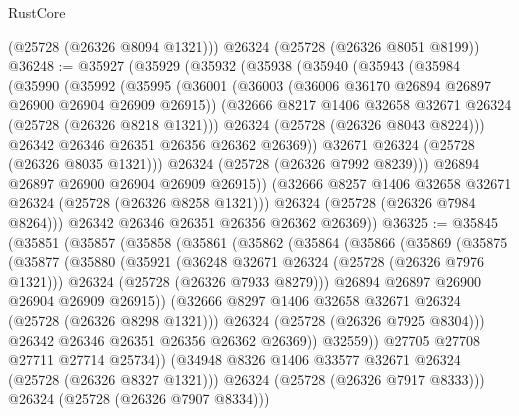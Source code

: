 \begin{lexlean}{RustCore}
\begin{coremodule}
      (@25728 (@26326 @8094 @1321)))
    @26324
    (@25728 (@26326 @8051 @8199))
@36248 := @35927
    (@35929
      (@35932
        (@35938
          (@35940
            (@35943
              (@35984
                (@35990
                  (@35992
                    (@35995
                      (@36001
                        (@36003 (@36006 @36170 @26894 @26897 @26900 @26904 @26909 @26915))
                        (@32666 @8217 @1406 @32658 @32671 @26324 (@25728 (@26326 @8218 @1321)))
                        @26324
                        (@25728 (@26326 @8043 @8224)))
                      @26342
                      @26346
                      @26351
                      @26356
                      @26362
                      @26369))
                  @32671
                  @26324
                  (@25728 (@26326 @8035 @1321)))
                @26324
                (@25728 (@26326 @7992 @8239)))
              @26894
              @26897
              @26900
              @26904
              @26909
              @26915))
          (@32666 @8257 @1406 @32658 @32671 @26324 (@25728 (@26326 @8258 @1321)))
          @26324
          (@25728 (@26326 @7984 @8264)))
        @26342
        @26346
        @26351
        @26356
        @26362
        @26369))
@36325 := @35845
    (@35851
      (@35857
        (@35858
          (@35861
            (@35862
              (@35864
                (@35866
                  (@35869
                    (@35875
                      (@35877
                        (@35880
                          (@35921
                            (@36248 @32671 @26324 (@25728 (@26326 @7976 @1321)))
                            @26324
                            (@25728 (@26326 @7933 @8279)))
                          @26894
                          @26897
                          @26900
                          @26904
                          @26909
                          @26915))
                      (@32666 @8297 @1406 @32658 @32671 @26324 (@25728 (@26326 @8298 @1321)))
                      @26324
                      (@25728 (@26326 @7925 @8304)))
                    @26342
                    @26346
                    @26351
                    @26356
                    @26362
                    @26369))
                @32559))
            @27705
            @27708
            @27711
            @27714
            @25734))
        (@34948 @8326 @1406 @33577 @32671 @26324 (@25728 (@26326 @8327 @1321)))
        @26324
        (@25728 (@26326 @7917 @8333)))
      @26324
      (@25728 (@26326 @7907 @8334)))

\end{coremodule}
\end{lexlean}
